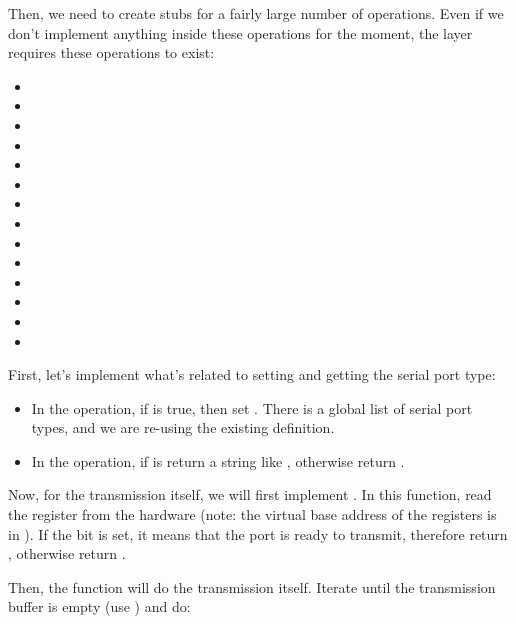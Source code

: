 Then, we need to create stubs for a fairly large number of
operations. Even if we don't implement anything inside these
operations for the moment, the  layer requires these
operations to exist:

\begin{itemize}
\item {}
\item {}
\item {}
\item {}
\item {}
\item {}
\item {}
\item {}
\item {}
\item {}
\item {}
\item {}
\item {}
\item {}
\end{itemize}

First, let's implement what's related to setting and getting the
serial port type:

\begin{itemize}

\item In the  operation, if 
  is true, then set . There is a global
  list of serial port types, and we are re-using the existing
  definition.

\item In the  operation, if  is  return a
  string like , otherwise return .

\end{itemize}

Now, for the transmission itself, we will first implement
. In this function, read the register  from
the hardware (note: the virtual base address of the registers is in
). If the  bit is set, it means that the
port is ready to transmit, therefore return , otherwise
return .

Then, the  function will do the transmission
itself. Iterate until the transmission buffer is empty (use
) and do:


